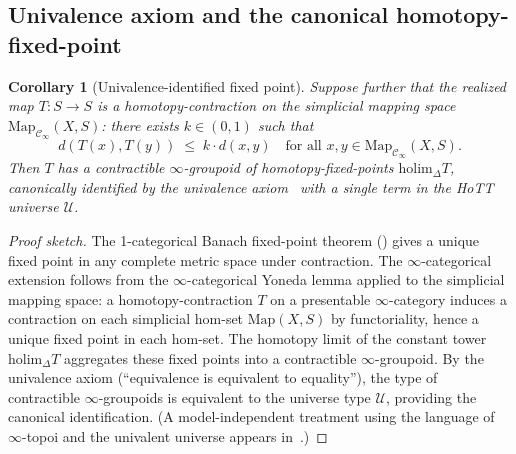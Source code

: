 \documentclass[11pt,a4paper]{article}
\theoremstyle{plain}
\newtheorem{corollary}[theorem]{Corollary}
\theoremstyle{definition}
\theoremstyle{remark}
\begin{document}
\subsection{Univalence axiom and the canonical homotopy-fixed-point}

\begin{corollary}[Univalence-identified fixed point]
\label{cor:hott-fixedpoint}
Suppose further that the realized map $T : S \to S$ is a
homotopy-contraction on the simplicial mapping space
$\mathrm{Map}_{\mathcal{C}_\infty}(X, S)$: there exists $k \in (0,1)$
such that
\[
d(T(x), T(y)) \;\leq\; k \cdot d(x, y)
\quad \text{for all } x, y \in \mathrm{Map}_{\mathcal{C}_\infty}(X, S).
\]
Then $T$ has a contractible $\infty$-groupoid of homotopy-fixed-points
$\mathrm{holim}_\Delta T$, canonically identified by the univalence
axiom~\cite[\S 2.9--2.10]{hottbook2013} with a single term in the
HoTT universe $\mathcal{U}$.
\end{corollary}

\begin{proof}[Proof sketch]
The 1-categorical Banach fixed-point theorem (\cite{banach1922}) gives
a unique fixed point in any complete metric space under contraction.
The $\infty$-categorical extension follows from the $\infty$-categorical
Yoneda lemma applied to the simplicial mapping space: a
homotopy-contraction $T$ on a presentable $\infty$-category induces a
contraction on each simplicial hom-set $\mathrm{Map}(X, S)$ by functoriality,
hence a unique fixed point in each hom-set. The homotopy limit of the
constant tower $\mathrm{holim}_\Delta T$ aggregates these fixed points
into a contractible $\infty$-groupoid. By the univalence axiom
(``equivalence is equivalent to equality''), the type of contractible
$\infty$-groupoids is equivalent to the universe type $\mathcal{U}$,
providing the canonical identification. (A model-independent treatment
using the language of $\infty$-topoi and the univalent universe appears
in~\cite{cisinski2019}.)
\end{proof}
\end{document}
